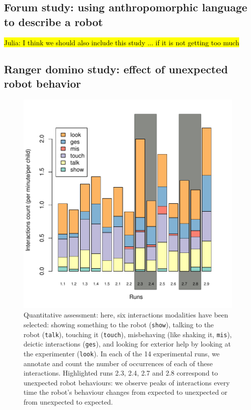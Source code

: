 \documentclass{frontiersSCNS} %
\begin{document}
\subsection{Forum study: using anthropomorphic language to describe a robot}

\hl{Julia: I think we should also include this study ... if it is not getting too much}



\subsection{Ranger domino study: effect of unexpected robot behavior}

\begin{figure}
    \centering
    \includegraphics[width=0.6\columnwidth]{ranger-interactions-per-runs}
    \caption{Quantitative assessment: here, six interactions modalities have
        been selected: showing something to the robot ({\tt show}), talking to
        the robot ({\tt talk}), touching it ({\tt touch}), misbehaving (like
        shaking it, {\tt mis}), deictic interactions ({\tt ges}), and looking
        for exterior help by looking at the experimenter ({\tt look}). In each
        of the 14 experimental runs, we annotate and count the number of
        occurrences of each of these interactions.  Highlighted runs 2.3, 2.4,
        2.7 and 2.8 correspond to unexpected robot behaviours: we observe peaks
        of interactions every time the robot's behaviour changes from expected to
        unexpected or from unexpected to expected.}

    \label{interactions-per-run}
\end{figure}
\end{document}
